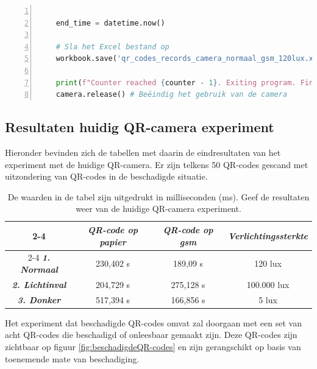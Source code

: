 \begin{lstlisting}[language=Python, caption={Python script voor experiment van QR-code camera.}, label=lst:huidigeQR-codeData, numbers=left]
    
    end_time = datetime.now()
    
    # Sla het Excel bestand op
    workbook.save('qr_codes_records_camera_normaal_gsm_120lux.xlsx')
    
    print(f"Counter reached {counter - 1}. Exiting program. Final time of scanning: {end_time - start_time}")
    camera.release() # Beëindig het gebruik van de camera    
\end{lstlisting}

\subsection{Resultaten huidig QR-camera experiment}
\label{sec:huidigeToepassingScannersExperiment}

Hieronder bevinden zich de tabellen met daarin de eindresultaten van het experiment met de huidige QR-camera. Er zijn telkens 50 QR-codes gescand met uitzondering van QR-codes in de beschadigde situatie.

\begin{table}[h]
    \centering
    \begin{tabular}{ c|c|c|c }
        \cline{2-4}
        & \textbf{\textit{QR-code op papier}} & \textbf{\textit{QR-code op gsm}} & \textbf{\textit{Verlichtingssterkte}} \\
        \cline{2-4}        
        \hline
        \textbf{\textit{1. Normaal}} &  230,402 s & 189,09 s & 120 lux \\
        \hline
        \textbf{\textit{2. Lichtinval}} & 204,729 s & 275,128 s & 100.000 lux \\
        \hline
        \textbf{\textit{3. Donker}} & 517,394 s & 166,856 s & 5 lux \\
        \hline        
    \end{tabular}
    \captionsetup{justification=centering}
    \caption{De waarden in de tabel zijn uitgedrukt in milliseconden (ms). Geef de resultaten weer van de huidige QR-camera experiment.}
    \label{tab:3expeQR-camera}
\end{table}

Het experiment dat beschadigde QR-codes omvat zal doorgaan met een set van acht QR-codes die beschadigd of onleesbaar gemaakt zijn. Deze QR-codes zijn zichtbaar op figuur \ref{fig:beschadigdeQR-codes} en zijn gerangschikt op basis van toenemende mate van beschadiging.

